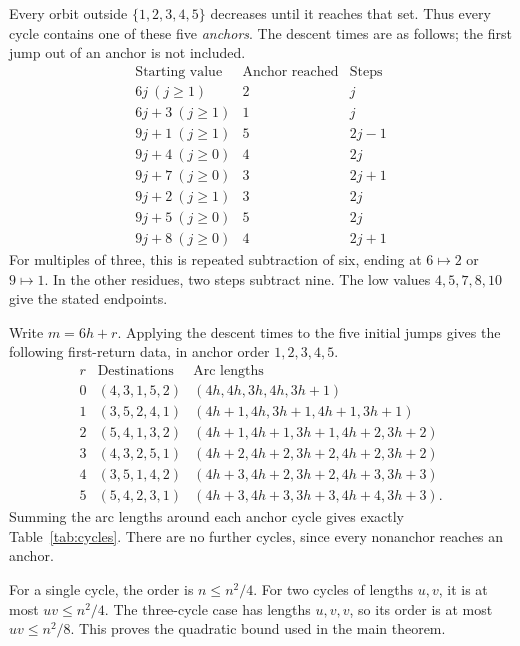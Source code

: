Every orbit outside $\{1,2,3,4,5\}$ decreases until it reaches that
set. Thus every cycle contains one of these five \emph{anchors}.
The descent times are as follows; the first jump out of an anchor is
not included.
\[
\renewcommand{\arraystretch}{1.15}
\begin{array}{c|c|c}
\text{Starting value}&\text{Anchor reached}&\text{Steps}\\\hline
6j\ (j\ge1)&2&j\\
6j+3\ (j\ge1)&1&j\\
9j+1\ (j\ge1)&5&2j-1\\
9j+4\ (j\ge0)&4&2j\\
9j+7\ (j\ge0)&3&2j+1\\
9j+2\ (j\ge1)&3&2j\\
9j+5\ (j\ge0)&5&2j\\
9j+8\ (j\ge0)&4&2j+1
\end{array}
\]
For multiples of three, this is repeated subtraction of six, ending
at $6\mapsto2$ or $9\mapsto1$. In the other residues, two steps
subtract nine. The low values $4,5,7,8,10$ give the stated endpoints.

Write $m=6h+r$. Applying the descent times to the five initial jumps
gives the following first-return data, in anchor order $1,2,3,4,5$.
\[
\renewcommand{\arraystretch}{1.2}
\begin{array}{c|c|c}
r&\text{Destinations}&\text{Arc lengths}\\\hline
0&(4,3,1,5,2)&(4h,4h,3h,4h,3h+1)\\
1&(3,5,2,4,1)&(4h+1,4h,3h+1,4h+1,3h+1)\\
2&(5,4,1,3,2)&(4h+1,4h+1,3h+1,4h+2,3h+2)\\
3&(4,3,2,5,1)&(4h+2,4h+2,3h+2,4h+2,3h+2)\\
4&(3,5,1,4,2)&(4h+3,4h+2,3h+2,4h+3,3h+3)\\
5&(5,4,2,3,1)&(4h+3,4h+3,3h+3,4h+4,3h+3).
\end{array}
\]
Summing the arc lengths around each anchor cycle gives exactly
Table~\ref{tab:cycles}. There are no further cycles, since every
nonanchor reaches an anchor.

For a single cycle, the order is $n\le n^2/4$. For two cycles of
lengths $u,v$, it is at most $uv\le n^2/4$. The three-cycle case has
lengths $u,v,v$, so its order is at most $uv\le n^2/8$.
This proves the quadratic bound used in the main theorem.
